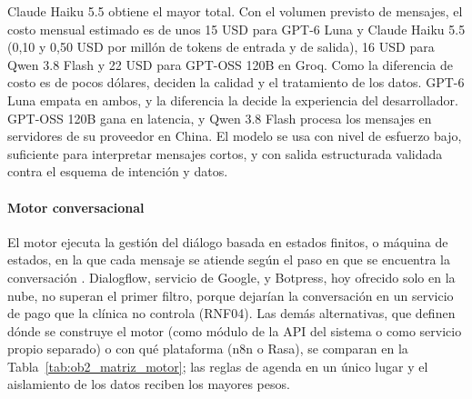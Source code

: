 Claude Haiku 5.5 obtiene el mayor total. Con el volumen previsto de mensajes, el costo mensual estimado es de unos 15 USD para GPT-6 Luna y Claude Haiku 5.5 (0,10 y 0,50 USD por millón de tokens de entrada y de salida), 16 USD para Qwen 3.8 Flash y 22 USD para GPT-OSS 120B en Groq. Como la diferencia de costo es de pocos dólares, deciden la calidad y el tratamiento de los datos. GPT-6 Luna empata en ambos, y la diferencia la decide la experiencia del desarrollador. GPT-OSS 120B gana en latencia, y Qwen 3.8 Flash procesa los mensajes en servidores de su proveedor en China. El modelo se usa con nivel de esfuerzo bajo, suficiente para interpretar mensajes cortos, y con salida estructurada validada contra el esquema de intención y datos.

\paragraph{Motor conversacional}

El motor ejecuta la gestión del diálogo basada en estados finitos, o máquina de estados, en la que cada mensaje se atiende según el paso en que se encuentra la conversación \cite{jurafsky2025slp}. Dialogflow, servicio de Google, y Botpress, hoy ofrecido solo en la nube, no superan el primer filtro, porque dejarían la conversación en un servicio de pago que la clínica no controla (RNF04). Las demás alternativas, que definen dónde se construye el motor (como módulo de la API del sistema o como servicio propio separado) o con qué plataforma (n8n o Rasa), se comparan en la Tabla~\ref{tab:ob2_matriz_motor}; las reglas de agenda en un único lugar y el aislamiento de los datos reciben los mayores pesos.

